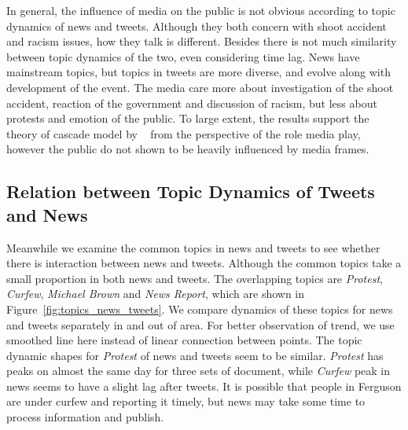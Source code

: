 In general, the influence of media on the public is not obvious according to topic dynamics of news and tweets. Although they both concern with shoot accident and racism issues, how they talk is different. Besides there is not much similarity between topic dynamics of the two, even considering time lag. News have mainstream topics, but topics in tweets are more diverse, and evolve along with development of the event. The media care more about investigation of the shoot accident, reaction of the government and discussion of racism, but less about protests and emotion of the public. To large extent, the results support the theory of cascade model by ~ from the perspective of the role media play, however the public do not shown to be heavily influenced by media frames.

\subsection{Relation between Topic Dynamics of Tweets and News}
Meanwhile we examine the common topics in news and tweets to see whether there is interaction between news and tweets. Although the common topics take a small proportion in both news and tweets. The overlapping topics are \emph{Protest}, \emph{Curfew}, \emph{Michael Brown} and \emph{News Report}, which are shown in Figure~\ref{fig:topics_news_tweets}. We compare dynamics of these topics for news and tweets separately in and out of \stlouis area. For better observation of trend, we use smoothed line here instead of linear connection between points. The topic dynamic shapes for \emph{Protest} of news and tweets seem to be similar. \emph{Protest} has peaks on almost the same day for three sets of document, while \emph{Curfew} peak in news seems to have a slight lag after tweets. It is possible that people in Ferguson are under curfew and reporting it timely, but news may take some time to process information and publish.


